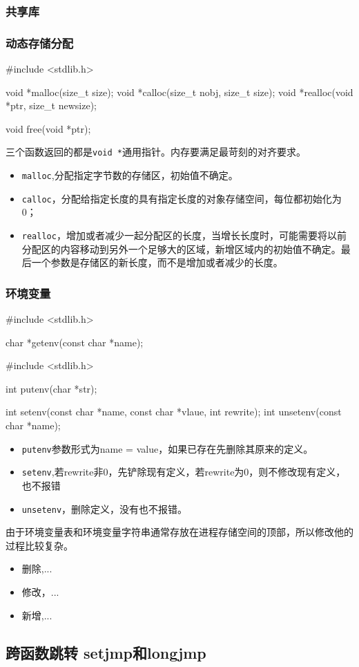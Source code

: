 \subsubsection{共享库}

\subsubsection{动态存储分配}

\begin{C}
#include <stdlib.h>

void *malloc(size_t size);
void *calloc(size_t nobj, size_t size);
void *realloc(void *ptr, size_t newsize);

void free(void *ptr);
\end{C}

三个函数返回的都是\lstinline$void *$通用指针。内存要满足最苛刻的对齐要求。
\begin{itemize}
\item \lstinline$malloc$,分配指定字节数的存储区，初始值不确定。
\item \lstinline$calloc$，分配给指定长度的具有指定长度的对象存储空间，每位都初始化为0；
\item \lstinline$realloc$，增加或者减少一起分配区的长度，当增长长度时，可能需要将以前分配区的内容移动到另外一个足够大的区域，新增区域内的初始值不确定。最后一个参数是存储区的新长度，而不是增加或者减少的长度。
\end{itemize}

\subsubsection{环境变量}

\begin{C}
#include <stdlib.h>

char *getenv(const char *name);
\end{C}

\begin{C}[成功返回0]
#include <stdlib.h>

int putenv(char *str);

int setenv(const char *name, const char *vlaue, int rewrite);
int unsetenv(const char *name);
\end{C}

\begin{itemize}
\item \lstinline$putenv$参数形式为name = value，如果已存在先删除其原来的定义。
\item \lstinline$setenv$,若rewrite非0，先铲除现有定义，若rewrite为0，则不修改现有定义，也不报错
\item \lstinline$unsetenv$，删除定义，没有也不报错。
\end{itemize}

由于环境变量表和环境变量字符串通常存放在进程存储空间的顶部，所以修改他的过程比较复杂。
\begin{itemize}
\item 删除,...
\item 修改，...
\item 新增,...
\end{itemize}

\subsection{跨函数跳转 setjmp和longjmp}